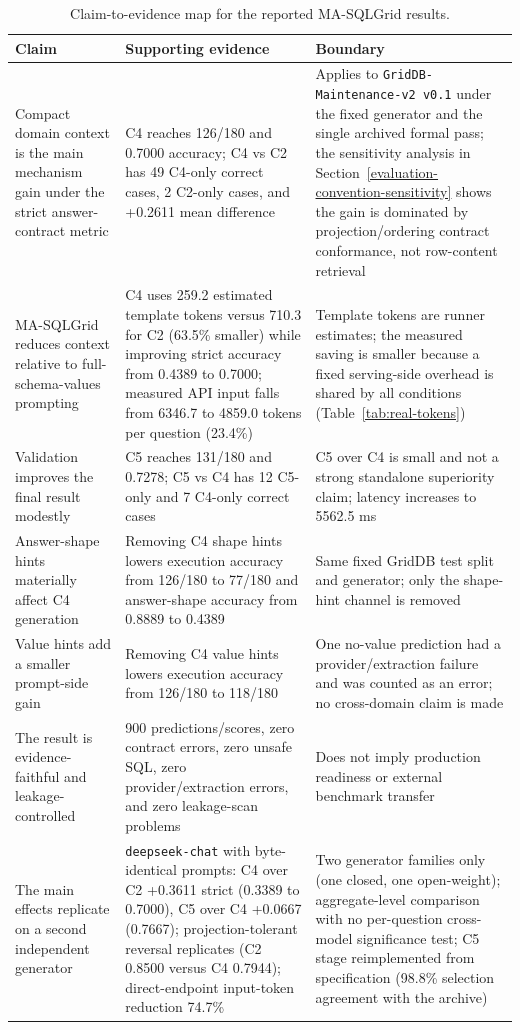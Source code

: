 \documentclass{ieeeaccess}
\begin{document}
\begin{table}[t]
\caption{Claim-to-evidence map for the reported MA-SQLGrid results.}
\centering
\footnotesize
\begin{tabularx}{\textwidth}{p{}Xp{}}
\toprule
Claim & Supporting evidence & Boundary \\
\midrule
Compact domain context is the main mechanism gain under the strict answer-contract metric & C4 reaches 126/180 and 0.7000 accuracy; C4 vs C2 has 49 C4-only correct cases, 2 C2-only cases, and +0.2611 mean difference & Applies to \texttt{GridDB-Maintenance-v2 v0.1} under the fixed generator and the single archived formal pass; the sensitivity analysis in Section~\ref{evaluation-convention-sensitivity} shows the gain is dominated by projection/ordering contract conformance, not row-content retrieval \\
MA-SQLGrid reduces context relative to full-schema-values prompting & C4 uses 259.2 estimated template tokens versus 710.3 for C2 (63.5\% smaller) while improving strict accuracy from 0.4389 to 0.7000; measured API input falls from 6346.7 to 4859.0 tokens per question (23.4\%) & Template tokens are runner estimates; the measured saving is smaller because a fixed serving-side overhead is shared by all conditions (Table~\ref{tab:real-tokens}) \\
Validation improves the final result modestly & C5 reaches 131/180 and 0.7278; C5 vs C4 has 12 C5-only and 7 C4-only correct cases & C5 over C4 is small and not a strong standalone superiority claim; latency increases to 5562.5 ms \\
Answer-shape hints materially affect C4 generation & Removing C4 shape hints lowers execution accuracy from 126/180 to 77/180 and answer-shape accuracy from 0.8889 to 0.4389 & Same fixed GridDB test split and generator; only the shape-hint channel is removed \\
Value hints add a smaller prompt-side gain & Removing C4 value hints lowers execution accuracy from 126/180 to 118/180 & One no-value prediction had a provider/extraction failure and was counted as an error; no cross-domain claim is made \\
The result is evidence-faithful and leakage-controlled & 900 predictions/scores, zero contract errors, zero unsafe SQL, zero provider/extraction errors, and zero leakage-scan problems & Does not imply production readiness or external benchmark transfer \\
The main effects replicate on a second independent generator & \texttt{deepseek-chat} with byte-identical prompts: C4 over C2 +0.3611 strict (0.3389 to 0.7000), C5 over C4 +0.0667 (0.7667); projection-tolerant reversal replicates (C2 0.8500 versus C4 0.7944); direct-endpoint input-token reduction 74.7\% & Two generator families only (one closed, one open-weight); aggregate-level comparison with no per-question cross-model significance test; C5 stage reimplemented from specification (98.8\% selection agreement with the archive) \\

\end{tabularx}
\end{table}
\end{document}
